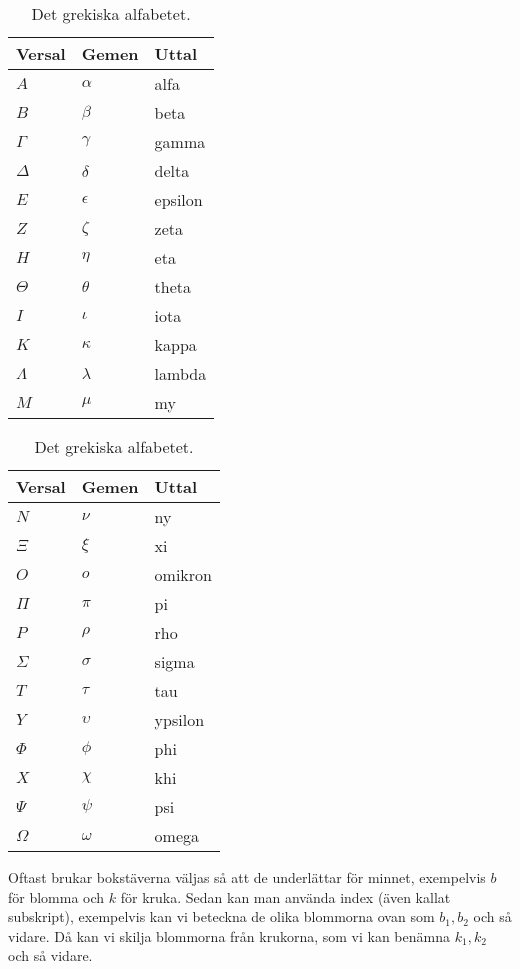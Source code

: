 \begin{table}
  \caption{Det grekiska alfabetet.}
  \begin{tabular}{lll}
    \textbf{Versal} & \textbf{Gemen} & \textbf{Uttal} \\
    \toprule
    \(A\) & \(\alpha\) & alfa \\
    \(B\) & \(\beta\) & beta \\
    \(\Gamma\) & \(\gamma\) & gamma \\
    \(\Delta\) & \(\delta\) & delta \\
    \(E\) & \(\epsilon\) & epsilon \\
    \(Z\) & \(\zeta\) & zeta \\
    \(H\) & \(\eta\) & eta \\
    \(\Theta\) & \(\theta\) & theta \\
    \(I\) & \(\iota\) & iota \\
    \(K\) & \(\kappa\) & kappa \\
    \(\Lambda\) & \(\lambda\) & lambda \\
    \(M\) & \(\mu\) & my \\
    \bottomrule
  \end{tabular}
  \hspace{1em}
  \begin{tabular}{lll}
    \textbf{Versal} & \textbf{Gemen} & \textbf{Uttal} \\
    \toprule
    \(N\) & \(\nu\) & ny \\
    \(\Xi\) & \(\xi\) & xi \\
    \(O\) & \(o\) & omikron \\
    \(\Pi\) & \(\pi\) & pi \\
    \(P\) & \(\rho\) & rho \\
    \(\Sigma\) & \(\sigma\) & sigma \\
    \(T\) & \(\tau\) & tau \\
    \(Y\) & \(\upsilon\) & ypsilon \\
    \(\Phi\) & \(\phi\) & phi \\
    \(X\) & \(\chi\) & khi \\
    \(\Psi\) & \(\psi\) & psi \\
    \(\Omega\) & \(\omega\) & omega \\
    \bottomrule
  \end{tabular}\label{tbl:greekalpha}
\end{table}

Oftast brukar bokstäverna väljas så att de underlättar för minnet, exempelvis 
\(b\) för blomma och \(k\) för kruka.
Sedan kan man använda index (även kallat subskript), exempelvis kan vi beteckna 
de olika blommorna ovan som \(b_1, b_2\) och så vidare.
Då kan vi skilja blommorna från krukorna, som vi kan benämna \(k_1, k_2\) och 
så vidare.


